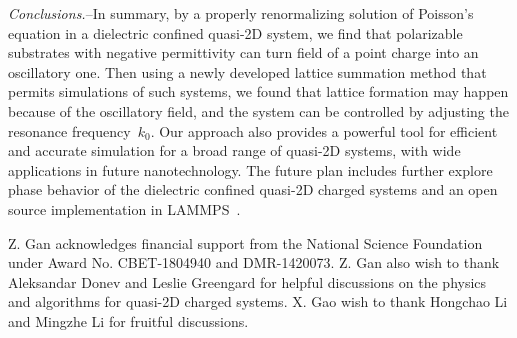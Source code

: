 \documentclass[aps,prl,reprint,showpacs,floatfix,superscriptaddress]{revtex4-2}
\begin{document}
\textit{Conclusions.}--In summary, by a properly renormalizing solution of Poisson's equation in a dielectric confined quasi-2D system, we find that polarizable substrates with negative permittivity can turn field of a point charge into an oscillatory one. 
Then using a newly developed lattice summation method that permits simulations of such systems, we found that lattice formation may happen because of the oscillatory field, and the system can be controlled by adjusting the resonance frequency~$k_0$.
Our approach also provides a powerful tool for efficient and accurate simulation for a broad range of quasi-2D systems, with wide applications in future nanotechnology. The future plan includes further explore phase behavior of the dielectric confined quasi-2D charged systems and an open source implementation in LAMMPS~\cite{LAMMPS}. 


Z. Gan acknowledges financial support from the National Science Foundation under Award No. CBET-1804940 and DMR-1420073. Z. Gan also wish to thank Aleksandar Donev and Leslie Greengard for helpful discussions on the physics and algorithms for quasi-2D charged systems. X. Gao wish to thank Hongchao Li and Mingzhe Li for fruitful discussions.


\end{document}
